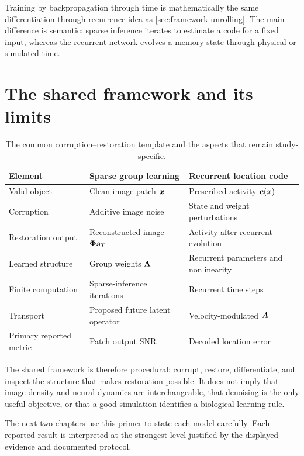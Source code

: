 Training by backpropagation through time is mathematically the same differentiation-through-recurrence idea as \cref{sec:framework-unrolling}. The main difference is semantic: sparse inference iterates to estimate a code for a fixed input, whereas the recurrent network evolves a memory state through physical or simulated time.

\section{The shared framework and its limits}
\label{sec:framework-comparison}

\begin{table}[ht]
\centering
\caption{The common corruption--restoration template and the aspects that remain study-specific.}
\label{tab:framework-comparison}
\begin{tabularx}{\textwidth}{@{}lXX@{}}
\toprule
Element & Sparse group learning & Recurrent location code \\
\midrule
Valid object & Clean image patch $\bm{x}$ & Prescribed activity $\bm{c}(x)$ \\
Corruption & Additive image noise & State and weight perturbations \\
Restoration output & Reconstructed image $\bm{\Phi}\bm{s}_T$ & Activity after recurrent evolution \\
Learned structure & Group weights $\bm{\Lambda}$ & Recurrent parameters and nonlinearity \\
Finite computation & Sparse-inference iterations & Recurrent time steps \\
Transport & Proposed future latent operator & Velocity-modulated $\bm{A}$ \\
Primary reported metric & Patch output SNR & Decoded location error \\
\bottomrule
\end{tabularx}
\end{table}

The shared framework is therefore procedural: corrupt, restore, differentiate, and inspect the structure that makes restoration possible. It does not imply that image density and neural dynamics are interchangeable, that denoising is the only useful objective, or that a good simulation identifies a biological learning rule.

The next two chapters use this primer to state each model carefully. Each reported result is interpreted at the strongest level justified by the displayed evidence and documented protocol.
